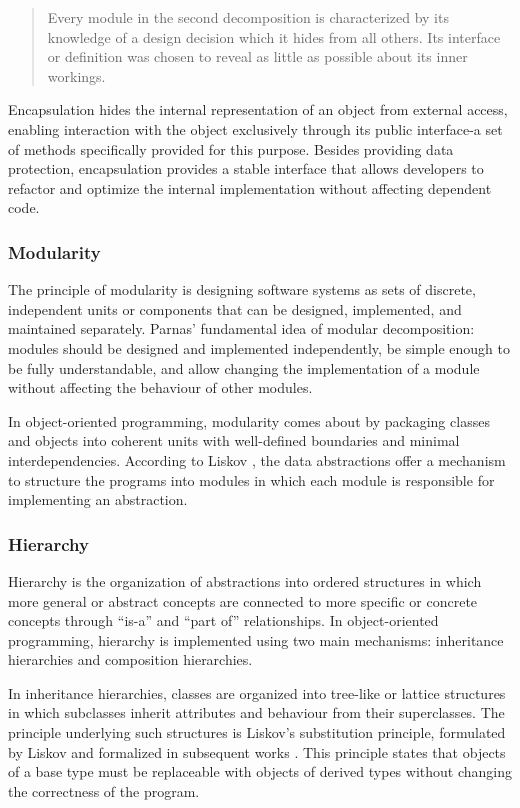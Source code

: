 \begin{quote}
    Every module in the second decomposition is characterized by its knowledge of a design decision which it hides from all others. Its interface or definition was chosen to reveal as little as possible about its inner workings. 
\end{quote}

Encapsulation hides the internal representation of an object from external access, enabling interaction with the object exclusively through its public interface-a set of methods specifically provided for this purpose. Besides providing data protection, encapsulation provides a stable interface that allows developers to refactor and optimize the internal implementation without affecting dependent code. 

\subsubsection{Modularity}

The principle of modularity is designing software systems as sets of discrete, independent units or components that can be designed, implemented, and maintained separately. Parnas' \cite{parnas1972criteria} fundamental idea of modular decomposition: modules should be designed and implemented independently, be simple enough to be fully understandable, and allow changing the implementation of a module without affecting the behaviour of other modules.

In object-oriented programming, modularity comes about by packaging classes and objects into coherent units with well-defined boundaries and minimal interdependencies. According to Liskov \cite{liskov1987keynote}, the data abstractions offer a mechanism to structure the programs into modules in which each module is responsible for implementing an abstraction.

\subsubsection{Hierarchy}

Hierarchy is the organization of abstractions into ordered structures in which more general or abstract concepts are connected to more specific or concrete concepts through “is-a” and “part of” relationships. In object-oriented programming, hierarchy is implemented using two main mechanisms: inheritance hierarchies and composition hierarchies.

In inheritance hierarchies, classes are organized into tree-like or lattice structures in which subclasses inherit attributes and behaviour from their superclasses. The principle underlying such structures is Liskov's substitution principle, formulated by Liskov \cite{liskov1987keynote} and formalized in subsequent works \cite{liskov1999behavioral}. This principle states that objects of a base type must be replaceable with objects of derived types without changing the correctness of the program. 

